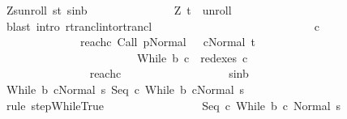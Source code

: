 \begin{isabellebody}
\ Z{\isacharunderscore}s{\isacharunderscore}unroll\ s{\isacharunderscore}t\ s{\isacharunderscore}in{\isacharunderscore}b\ \isanewline
\ \ \ \ \ \ \ \ \ \ \ \ \isamarkupfalse%
\ {\isachardoublequoteopen}{\isacharparenleft}Z{\isacharcomma}\ t{\isacharparenright}\ {\isasymin}\ {\isacharquery}unroll{\isachardoublequoteclose}\isanewline
\ \ \ \ \ \ \ \ \ \ \ \ \ \ \isamarkupfalse%
\ {\isacharparenleft}blast\ intro{\isacharcolon}\ rtrancl{\isacharunderscore}into{\isacharunderscore}rtrancl{\isacharparenright}\isanewline
\ \ \ \ \ \ \ \ \ \ \ \ \isamarkupfalse%
\ \isanewline
\ \ \ \ \ \ \ \ \ \ \ \ \isamarkupfalse%
\ c{\isacharprime}{\isacharprime}\ \isanewline
\ \ \ \ \ \ \ \ \ \ \ \ \ \ reach{\isacharunderscore}c{\isacharprime}{\isacharprime}{\isacharcolon}\ {\isachardoublequoteopen}{\isasymGamma}{\isasymturnstile}{\isacharparenleft}Call\ p{\isacharcomma}Normal\ {\isasymsigma}{\isacharparenright}\ {\isasymrightarrow}\isactrlsup {\isacharplus}\ {\isacharparenleft}c{\isacharprime}{\isacharprime}{\isacharcomma}Normal\ t{\isacharparenright}{\isachardoublequoteclose}\ \isanewline
\ \ \ \ \ \ \ \ \ \ \ \ \ \ \ \ \ \ \ \ \ \ \ \ {\isachardoublequoteopen}{\isacharparenleft}While\ b\ c{\isacharparenright}\ {\isasymin}\ redexes\ c{\isacharprime}{\isacharprime}{\isachardoublequoteclose}\isanewline
\ \ \ \ \ \ \ \ \ \ \ \ \isamarkupfalse%
\ {\isacharminus}\isanewline
\ \ \ \ \ \ \ \ \ \ \ \ \ \ \isamarkupfalse%
\ reach{\isacharunderscore}c\ {\isacharparenleft}{}{\isacharparenright}\isanewline
\ \ \ \ \ \ \ \ \ \ \ \ \ \ \isamarkupfalse%
\ \isamarkupfalse%
\ s{\isacharunderscore}in{\isacharunderscore}b\ \ \isanewline
\ \ \ \ \ \ \ \ \ \ \ \ \ \ \isamarkupfalse%
\ {\isachardoublequoteopen}{\isasymGamma}{\isasymturnstile}{\isacharparenleft}While\ b\ c{\isacharcomma}Normal\ s{\isacharparenright}{\isasymrightarrow}\ {\isacharparenleft}Seq\ c\ {\isacharparenleft}While\ b\ c{\isacharparenright}{\isacharcomma}Normal\ s{\isacharparenright}{\isachardoublequoteclose}\isanewline
\ \ \ \ \ \ \ \ \ \ \ \ \ \ \ \ \isamarkupfalse%
\ {\isacharparenleft}rule\ step{\isachardot}WhileTrue{\isacharparenright}\isanewline
\ \ \ \ \ \ \ \ \ \ \ \ \ \ \isamarkupfalse%
\ {\isachardoublequoteopen}{\isasymGamma}{\isasymturnstile}\ {\isacharparenleft}Seq\ c\ {\isacharparenleft}While\ b\ c{\isacharparenright}{\isacharcomma}\ Normal\ s{\isacharparenright}\ {\isasymrightarrow}\isactrlsup {\isacharplus}\isanewline

\end{isabellebody}
